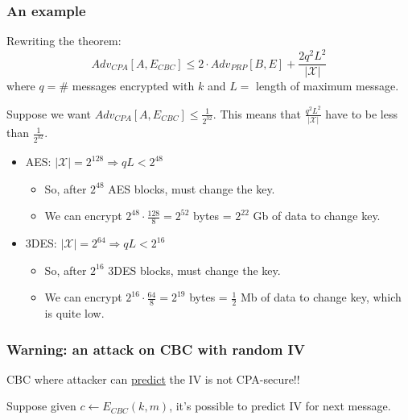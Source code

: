 \documentclass[12pt]{book}
\begin{document}
\subsubsection{An example}
Rewriting the theorem:
$$Adv_{CPA}[A,E_{CBC}]\leq 2\cdot Adv_{PRP}[B,E]+\frac{2q^{2}L^{2}}{|\mathcal{X}|}$$
where $q=\#$ messages encrypted with $k$ and $L=$ length of maximum message.

Suppose we want $Adv_{CPA}[A,E_{CBC}]\leq \frac{1}{2^{32}}$. This means that $\frac{q^{2}L^{2}}{|\mathcal{X}|}$ have to be less than $\frac{1}{2^{32}}$.
\begin{itemize}
	\item AES: $|\mathcal{X}|=2^{128}\Rightarrow qL<2^{48}$
	\begin{itemize}
		\item[] So, after $2^{48}$ AES blocks, must change the key.
		\item[] We can encrypt $2^{48}\cdot \frac{128}{8}=2^{52}$ bytes = $2^{22}$ Gb of data to change key.
	\end{itemize}
	\item 3DES: $|\mathcal{X}|=2^{64}\Rightarrow qL<2^{16}$
		\begin{itemize}
		\item[] So, after $2^{16}$ 3DES blocks, must change the key.
		\item[] We can encrypt $2^{16}\cdot \frac{64}{8}=2^{19}$ bytes = $\frac{1}{2}$ Mb of data to change key, which is quite low.
	\end{itemize}
\end{itemize}

\subsubsection{Warning: an attack on CBC with random IV}
CBC where attacker can \underline{predict} the IV is not CPA-secure!!

Suppose given $c\leftarrow E_{CBC}(k,m)$, it's possible to predict IV for next message.
\end{document}
